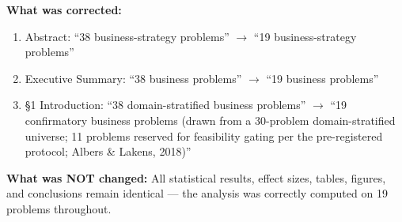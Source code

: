 \documentclass[12pt,a4paper]{article}
\begin{document}
\textbf{What was corrected:}
\begin{enumerate}
  \item Abstract: ``38 business-strategy problems'' $\to$ ``19 business-strategy problems''
  \item Executive Summary: ``38 business problems'' $\to$ ``19 business problems''
  \item \S 1 Introduction: ``38 domain-stratified business problems'' $\to$ ``19 confirmatory business problems (drawn from a 30-problem domain-stratified universe; 11 problems reserved for feasibility gating per the pre-registered protocol; Albers \& Lakens, 2018)''
\end{enumerate}

\textbf{What was NOT changed:} All statistical results, effect sizes, tables, figures, and
conclusions remain identical --- the analysis was correctly computed on 19 problems throughout.
\end{document}
